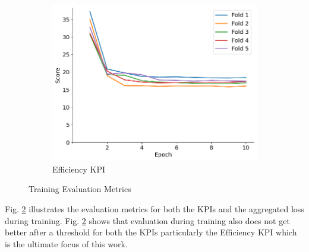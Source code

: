 \documentclass{report} %
\begin{document}
\begin{figure}[H]
    \begin{subfigure}{0.32\textwidth}
        \centering
        \includegraphics[width=\textwidth]{./ReportImages/train_score_y2.png}
        \caption{\centering Efficiency \ac{KPI}}
        \label{fig:Training Score for Efficiency grid}
    \end{subfigure}
    \caption{Training Evaluation Metrics}
    \label{fig:Training Evaluation Metrics}
\end{figure}

Fig. \ref{fig:Training Evaluation Metrics} illustrates the evaluation metrics for both the \ac{KPI}s and the aggregated loss during training.
Fig. \ref{fig:Training Evaluation Metrics} shows that evaluation during training also does not get better after a threshold for both the \ac{KPI}s particularly the 
Efficiency \ac{KPI} which is the ultimate focus of this work.
\end{document}
